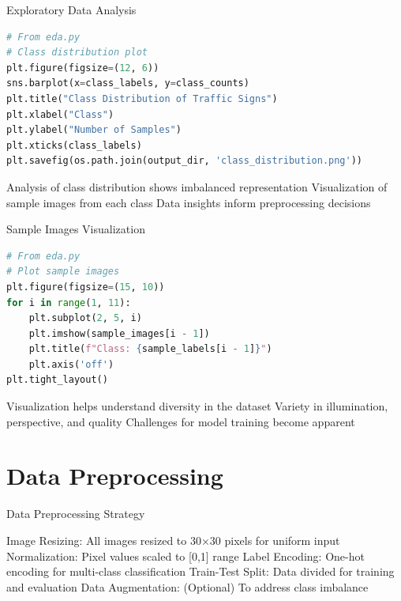 \documentclass{beamer}
\begin{document}
\begin{frame}{Exploratory Data Analysis}
\begin{lstlisting}[language=Python]
# From eda.py
# Class distribution plot
plt.figure(figsize=(12, 6))
sns.barplot(x=class_labels, y=class_counts)
plt.title("Class Distribution of Traffic Signs")
plt.xlabel("Class")
plt.ylabel("Number of Samples")
plt.xticks(class_labels)
plt.savefig(os.path.join(output_dir, 'class_distribution.png'))
\end{lstlisting}

\begin{itemize}
    Analysis of class distribution shows imbalanced representation
    Visualization of sample images from each class
    Data insights inform preprocessing decisions
\end{itemize}
\end{frame}

\begin{frame}{Sample Images Visualization}
\begin{lstlisting}[language=Python]
# From eda.py
# Plot sample images
plt.figure(figsize=(15, 10))
for i in range(1, 11):
    plt.subplot(2, 5, i)
    plt.imshow(sample_images[i - 1])
    plt.title(f"Class: {sample_labels[i - 1]}")
    plt.axis('off')
plt.tight_layout()
\end{lstlisting}

\begin{itemize}
Visualization helps understand diversity in the dataset
Variety in illumination, perspective, and quality
Challenges for model training become apparent
\end{itemize}
\end{frame}

\section{Data Preprocessing}

\begin{frame}{Data Preprocessing Strategy}
\begin{itemize}
    {Image Resizing}: All images resized to 30×30 pixels for uniform input
    {Normalization}: Pixel values scaled to [0,1] range
    {Label Encoding}: One-hot encoding for multi-class classification
    {Train-Test Split}: Data divided for training and evaluation
    {Data Augmentation}: (Optional) To address class imbalance
\end{itemize}
\end{frame}
\end{document}
